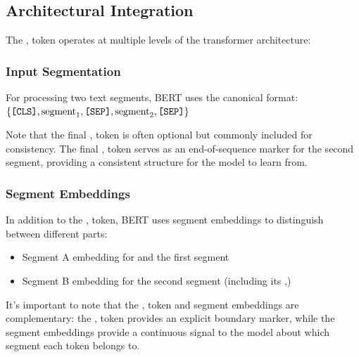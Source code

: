 \subsection{Architectural Integration}

The \sep{} token operates at multiple levels of the transformer architecture:

\subsubsection{Input Segmentation}
For processing two text segments, BERT uses the canonical format:
$\{\texttt{[CLS]}{}, \text{segment}_1, \texttt{[SEP]}{}, \text{segment}_2, \texttt{[SEP]}{}\}$

Note that the final \sep{} token is often optional but commonly included for consistency. The final \sep{} token serves as an end-of-sequence marker for the second segment, providing a consistent structure for the model to learn from.

\subsubsection{Segment Embeddings}
In addition to the \sep{} token, BERT uses segment embeddings to distinguish between different parts:
\begin{itemize}
\item Segment A embedding for \cls{} and the first segment
\item Segment B embedding for the second segment (including its \sep{})
\end{itemize}

It's important to note that the \sep{} token and segment embeddings are complementary: the \sep{} token provides an explicit boundary marker, while the segment embeddings provide a continuous signal to the model about which segment each token belongs to.

